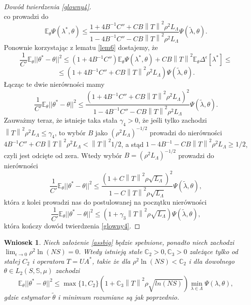 \documentclass{mwart}
\newtheorem{wn}{Wniosek}
\newcommand{\norm}[1]{\left\lVert#1\right\rVert}
\begin{document}
\begin{proof}[Dowód twierdzenia \ref{glowny4}]
\begin{displaymath}
\end{displaymath}
co prowadzi do
\begin{displaymath}
\mathbb{E}_{\theta}\Psi(\lambda^*,\theta)\leq\frac{1+4B^{-1}C''+CB\norm{T}^2\rho^2L_{\Lambda}}{1-4B^{-1}C''-CB\norm{T}^2\rho^2L_{\Lambda}}\Psi(\tilde{\lambda},\theta).
\end{displaymath}
Ponownie korzystając z lematu \ref{lem6} dostajemy, że
\begin{displaymath}
\frac{1}{C'}\mathbb{E}_{\theta}||\theta^*-\theta||^2\leq (1+4B^{-1}C'')\mathbb{E}_{\theta}\Psi(\lambda^*,\theta)+CB\norm{T}^2\mathbb{E}_{\theta}\Delta^{\epsilon}[\lambda^*]\leq
\end{displaymath}
\begin{displaymath}
\leq (1+4B^{-1}C''+CB\norm{T}^2\rho^2L_{\Lambda})\Psi(\tilde{\lambda},\theta).
\end{displaymath}
Łącząc te dwie nierówności mamy
\begin{displaymath}
\frac{1}{C'}\mathbb{E}_{\theta}||\theta^*-\theta||^2\leq \frac{(1+4B^{-1}C''+CB\norm{T}^2\rho^2L_{\Lambda})^2}{1-4B^{-1}C''-CB\norm{T}^2\rho^2L_{\Lambda}}\Psi(\tilde{\lambda},\theta).
\end{displaymath}
Zauważmy teraz, że istnieje taka stała $\gamma_4>0$, że jeśli tylko zachodzi $\norm{T}^2\rho^2L_{\Lambda}\leq \gamma_4$, to wybór $B$ jako $(\rho^2L_{\Lambda})^{-1/2}$ prowadzi do nierówności $4B^{-1}C''+CB\norm{T}^2\rho^2L_{\Lambda}<\norm{T}^2 1/2$, a stąd $1-4B^{-1}-CB\norm{T}^2\rho^2L_{\Lambda}\geq 1/2$, czyli jest odcięte od zera. Wtedy wybór $B=(\rho^2L_{\Lambda})^{-1/2}$ prowadzi do nierówności
\begin{displaymath}
\frac{1}{C'}\mathbb{E}_{\theta}||\theta^*-\theta||^2\leq \frac{(1+C\norm{T}^2\rho\sqrt{L_{\Lambda}})^2}{1-C\norm{T}^2\rho\sqrt{L_{\Lambda}}}\Psi(\tilde{\lambda},\theta),
\end{displaymath}
która z kolei prowadzi nas do postulowanej na początku nierówności
\begin{displaymath}
\frac{1}{C'}\mathbb{E}_{\theta}||\theta^*-\theta||^2\leq (1+\gamma_3\norm{T}^2\rho\sqrt{L_{\Lambda}})\Psi(\tilde{\lambda},\theta),
\end{displaymath}
która kończy dowód twierdzenia \ref{glowny4}.
\end{proof}


\begin{wn}
Niech założenie \ref{assbig} będzie spełnione, ponadto niech zachodzi $\lim_{\epsilon\to 0}\rho^2\ln(NS)=0$. Wtedy istnieją stałe $\mathbb{C}_2>0,\mathbb{C}_3>0$ zależące tylko od stałej $C_2$ i operatora $T=UA^*$, takie że dla $\rho^2\ln(NS)<\mathbb{C}_2$ i dla dowolnego $\theta\in L_2(S,\mathbb{S},\mu)$ zachodzi
\begin{displaymath}
\mathbb{E}_{\theta}||\theta^*-\theta||^2\leq \max\{1,C_2\}\left(1+\mathbb{C}_3\norm{T}^2\rho\sqrt{ln(NS)}\right)\min_{\lambda\in \Lambda}\Psi(\lambda,\theta),
\end{displaymath}
gdzie estymator $\tilde{\theta}$ i minimum rozumiane są jak poprzednio.
\end{wn}
\end{document}
